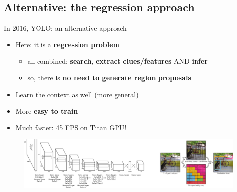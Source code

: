 \documentclass{beamer}[10pt, usepdftitle=false, handout]
\begin{document}
    \subsection{Alternative: the regression approach}    
    \begin{frame}

	In 2016, YOLO: an alternative approach

	\vspace*{1em}	
	
	\begin{itemize}
		\item{Here: it is a \textbf{regression problem}
			\begin{itemize}
				\item{all combined: \textbf{search}, \textbf{extract clues/features} AND \textbf{infer}}			
				\item{so, there is \textbf{no need to generate region proposals}}
						
			\end{itemize}	}	
			\item{Learn the context as well (more general)}		
			\item{More \textbf{easy to train}}
			\item{Much faster: 45 FPS on Titan GPU!}
		\end{itemize}							
			
		
			
			\begin{figure}
						\includegraphics[scale=0.5]{37.png} 
			\end{figure}	
	
    \end{frame}  
    
\end{document}
